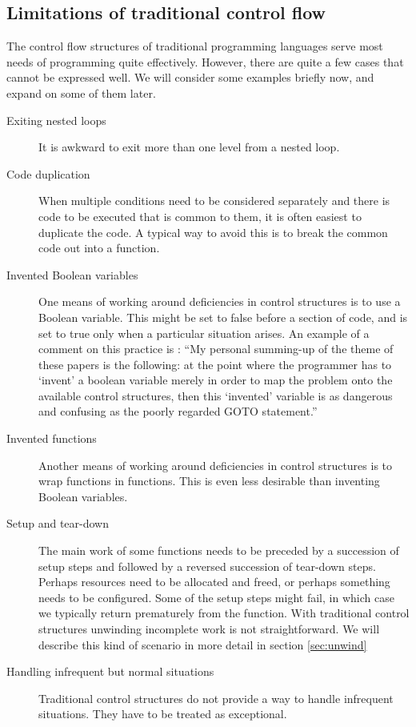 \documentclass[10pt]{amsart}
\begin{document}


\subsection{Limitations of traditional control flow}


The control flow structures of traditional programming languages serve
most needs of programming quite effectively.  However, there are quite
a few cases that cannot be expressed well.  We will consider some
examples briefly now, and expand on some of them later.
\begin{description}
\item[Exiting nested loops] It is awkward to exit more than one level
  from a nested loop.
\item[Code duplication]  When multiple conditions need to be
  considered separately and there is code to be executed that is
  common to them, it is often easiest to duplicate the code.  A
  typical way to avoid this is to break the common code out into a
  function.
\item[Invented Boolean variables] One means of working around
  deficiencies in control structures is to use a Boolean variable.
  This might be set to false before a section of code, and is set to
  true only when a particular situation arises.  An example of a
  comment on this practice is \cite[section 2.2, \emph{Deeply Nested
    IF-THEN-ELSE Considered Harmful}]{WilliamsDO84}: ``My personal
  summing-up of the theme of these papers is the following: at the
  point where the programmer has to `invent' a boolean variable merely
  in order to map the problem onto the available control structures,
  then this `invented' variable is as dangerous and confusing as the
  poorly regarded GOTO statement.''
\item[Invented functions] Another means of working around deficiencies
  in control structures is to wrap functions in functions.  This is
  even less desirable than inventing Boolean variables.
\item[Setup and tear-down] The main work of some functions needs to be
  preceded by a succession of setup steps and followed by a reversed
  succession of tear-down steps.  Perhaps resources need to be
  allocated and freed, or perhaps something needs to be configured.
  Some of the setup steps might fail, in which case we typically
  return prematurely from the function.  With traditional control
  structures unwinding incomplete work is not straightforward.  We
  will describe this kind of scenario in more detail in section
  \ref{sec:unwind}
\item[Handling infrequent but normal situations] Traditional control
  structures do not provide a way to handle infrequent situations.
  They have to be treated as exceptional.
\end{description}
\end{document}
